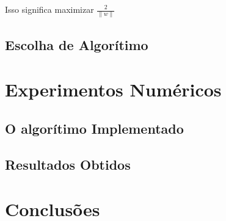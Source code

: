 \documentclass{article}
\begin{document}
Isso significa maximizar \(\frac{2}{\|w\|}\) 

\subsection{Escolha de Algorítimo}

\section{Experimentos Numéricos}
\subsection{O algorítimo Implementado}
\subsection{Resultados Obtidos}

\section{Conclusões}
\end{document}
